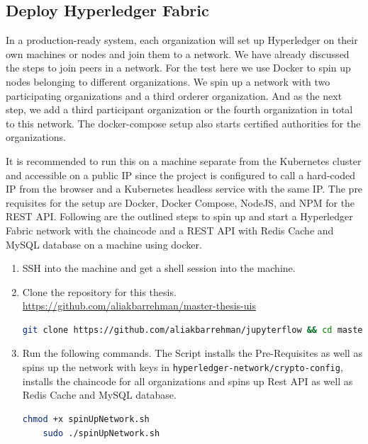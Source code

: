 \subsection{Deploy Hyperledger Fabric}
In a production-ready system, each organization will set up Hyperledger on their own machines or nodes and join them to a network. We have already discussed the steps to join peers in a network. For the test here we use Docker to spin up nodes belonging to different organizations. We spin up a network with two participating organizations and a third orderer organization. And as the next step, we add a third participant organization or the fourth organization in total to this network. The docker-compose setup also starts certified authorities for the organizations.

\bigskip
It is recommended to run this on a machine separate from the Kubernetes cluster and accessible on a public IP since the project is configured to call a hard-coded IP from the browser and a Kubernetes headless service with the same IP. The pre requisites for the setup are Docker, Docker Compose, NodeJS, and NPM for the REST API. Following are the outlined steps to spin up and start a Hyperledger Fabric network with the chaincode and a REST API with Redis Cache and MySQL database on a machine using docker.

\begin{enumerate}
    \item SSH into the machine and get a shell session into the machine.
    
    \item Clone the repository for this thesis. \url{https://github.com/aliakbarrehman/master-thesis-uis}
    \begin{lstlisting}[language=bash]
    git clone https://github.com/aliakbarrehman/jupyterflow && cd master-thesis-uis\end{lstlisting}
    
    \item Run the following commands. The Script installs the Pre-Requisites as well as spins up the network with keys in \lstinline{hyperledger-network/crypto-config}, installs the chaincode for all organizations and spins up Rest API as well as Redis Cache and MySQL database.
    \begin{lstlisting}[language=bash]
    chmod +x spinUpNetwork.sh
    sudo ./spinUpNetwork.sh\end{lstlisting} 
\end{enumerate}

